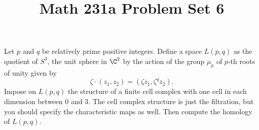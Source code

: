 \documentclass[11pt,letterpaper]{article}
\title{\textbf{Math 231a Problem Set 6}}
\begin{document}
\maketitle

\begin{problem}
   Let $p$ and $q$ be relatively prime positive integers. Define a space
$L(p, q)$ as the quotient of $S^3$, the unit sphere in $\C^2$ by the action of the group $\mu_p$ of $p$-th roots of unity given by
\[
    \zeta \cdot (z_1, z_2) = (\zeta z_1, \zeta^q z_2)
.\] 
\quad Impose on $L(p, q)$ the structure of a finite cell complex with one cell in each dimension between 0
and 3. The cell complex structure is just the filtration, but you should specify the characteristic
maps as well. Then compute the homology of $L(p, q)$.
\end{problem}
\end{document}

